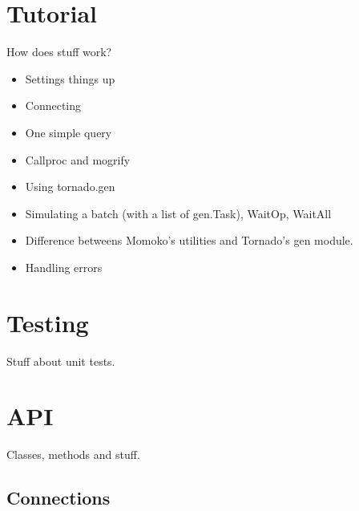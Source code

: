 \documentclass[letterpaper,10pt,english]{sphinxmanual}
\begin{document}
\chapter{Tutorial}
\label{tutorial:github-repository}\label{tutorial:id1}\label{tutorial:tutorial}\label{tutorial::doc}
How does stuff work?
\begin{itemize}
\item {} 
Settings things up

\item {} 
Connecting

\item {} 
One simple query

\item {} 
Callproc and mogrify

\item {} 
Using tornado.gen

\item {} 
Simulating a batch (with a list of gen.Task), WaitOp, WaitAll

\item {} 
Difference betweens Momoko's utilities and Tornado's gen module.

\item {} 
Handling errors

\end{itemize}


\chapter{Testing}
\label{testing:id1}\label{testing:testing}\label{testing::doc}
Stuff about unit tests.
\label{api:api}\label{api:module-momoko}\label{api:api}

\chapter{API}
\label{api:id1}\label{api::doc}
Classes, methods and stuff.


\section{Connections}
\label{api:connections}
\end{document}
